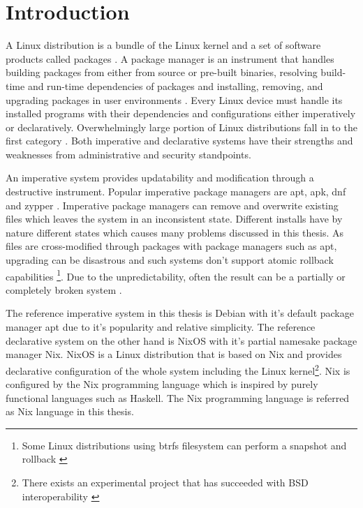 \chapter{Introduction} \label{johdanto}

A Linux distribution is a bundle of the Linux kernel and a set of
software products called packages \cite{gnuPackagesx2014}. A package
manager is an instrument that handles building packages from either
from source or pre-built binaries, resolving build-time and run-time
dependencies of packages and installing, removing, and upgrading
packages in user environments \cite{gnuPackagesx2014}. Every Linux
device must handle its installed programs with their dependencies and
configurations either imperatively or declaratively. Overwhelmingly
large portion of Linux distributions fall in to the first category
\cite{dolstra2008nixos}. Both imperative and declarative systems have
their strengths and weaknesses from administrative and security
standpoints.

An imperative system provides updatability and modification through a
destructive instrument. Popular imperative package managers are apt,
apk, dnf and zypper \cite{dolstra2008nixos}. Imperative package
managers can remove and overwrite existing files which leaves the
system in an inconsistent state. Different installs have by nature
different states which causes many problems discussed in this
thesis. As files are cross-modified through packages with package
managers such as apt, upgrading can be disastrous and such systems
don't support atomic rollback capabilities \footnote{Some Linux
distributions using btrfs filesystem can perform a snapshot and
rollback \cite{opensuseSystemRecovery}}. Due to the unpredictability,
often the result can be a partially or completely broken system
\cite{dolstra2008nixos}.

The reference imperative system in this thesis is Debian with it's
default package manager apt due to it's popularity and relative
simplicity. The reference declarative system on the other hand is
NixOS with it's partial namesake package manager Nix. NixOS is a Linux
distribution that is based on Nix and provides declarative
configuration of the whole system including the Linux
kernel\footnote{There exists an experimental project that has
succeeded with BSD interoperability \cite{githubGitHubNixosbsdnixbsd}}. Nix is configured by the Nix
programming language which is inspired by purely functional languages
such as Haskell. The Nix programming language is referred as Nix
language in this thesis. \cite{van2013reference}

